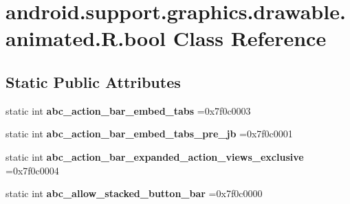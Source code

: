 \hypertarget{classandroid_1_1support_1_1graphics_1_1drawable_1_1animated_1_1R_1_1bool}{}\section{android.\+support.\+graphics.\+drawable.\+animated.\+R.\+bool Class Reference}
\label{classandroid_1_1support_1_1graphics_1_1drawable_1_1animated_1_1R_1_1bool}
\subsection*{Static Public Attributes}
\begin{DoxyCompactItemize}
\item 
\mbox{\label{classandroid_1_1support_1_1graphics_1_1drawable_1_1animated_1_1R_1_1bool_a3a5059fa34e047fc76d8578eb269d5dd}} 
static int {\bfseries abc\+\_\+action\+\_\+bar\+\_\+embed\+\_\+tabs} =0x7f0c0003
\item 
\mbox{\label{classandroid_1_1support_1_1graphics_1_1drawable_1_1animated_1_1R_1_1bool_aef586042cf2a3fcc5914f4c804e844db}} 
static int {\bfseries abc\+\_\+action\+\_\+bar\+\_\+embed\+\_\+tabs\+\_\+pre\+\_\+jb} =0x7f0c0001
\item 
\mbox{\label{classandroid_1_1support_1_1graphics_1_1drawable_1_1animated_1_1R_1_1bool_aad6474267ab173503a613a61ea2b6bc6}} 
static int {\bfseries abc\+\_\+action\+\_\+bar\+\_\+expanded\+\_\+action\+\_\+views\+\_\+exclusive} =0x7f0c0004
\item 
\mbox{\label{classandroid_1_1support_1_1graphics_1_1drawable_1_1animated_1_1R_1_1bool_abb9bf360930e1469308999e5aa4b6da4}} 
static int {\bfseries abc\+\_\+allow\+\_\+stacked\+\_\+button\+\_\+bar} =0x7f0c0000
\item 
\mbox{\label{classandroid_1_1support_1_1graphics_1_1drawable_1_1animated_1_1R_1_1bool_ac83deda7f1cbde7ad7f48a5c5de58e72}} 

\end{DoxyCompactItemize}
